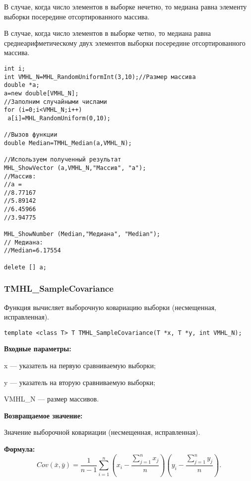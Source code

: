 \documentclass[a4paper,12pt]{article}
\begin{document}
В случае, когда число элементов в выборке нечетно, то медиана равна элементу выборки посередине отсортированного массива.

В случае, когда число элементов в выборке четно, то медиана равна среднеарифметическому двух элементов выборки посередине отсортированного массива.



\begin{lstlisting}[label=code_use_TMHL_Median,caption=Пример использования]
int i;
int VMHL_N=MHL_RandomUniformInt(3,10);//Размер массива
double *a;
a=new double[VMHL_N];
//Заполним случайными числами
for (i=0;i<VMHL_N;i++)
 a[i]=MHL_RandomUniform(0,10);

//Вызов функции
double Median=TMHL_Median(a,VMHL_N);

//Используем полученный результат
MHL_ShowVector (a,VMHL_N,"Массив", "a");
//Массив:
//a =
//8.77167
//5.89142
//6.45966
//3.94775

MHL_ShowNumber (Median,"Медиана", "Median");
// Медиана:
//Median=6.17554

delete [] a;
\end{lstlisting}

\subsubsection{TMHL\_SampleCovariance}\label{TMHL_SampleCovariance}

Функция вычисляет выборочную ковариацию выборки (несмещенная, исправленная).


\begin{lstlisting}[label=code_syntax_TMHL_SampleCovariance,caption=Синтаксис]
template <class T> T TMHL_SampleCovariance(T *x, T *y, int VMHL_N);
\end{lstlisting}

\textbf{Входные параметры:}
 
x --- указатель на первую сравниваемую выборки;
 
y --- указатель на вторую сравниваемую выборки;
 
VMHL\_N --- размер массивов.

\textbf{Возвращаемое значение:}
 
Значение выборочной ковариации (несмещенная, исправленная).

\textbf{Формула:}
\begin{equation*}
Cov\left(\bar{x},\bar{y} \right)= \dfrac{1}{n-1}\sum_{i=1}^{n} \left( x_i-\dfrac{\sum_{j=1}^{n}x_j}{n}\right)\left( y_i-\dfrac{\sum_{j=1}^{n}y_j}{n}\right) .
\end{equation*}
\end{document}
